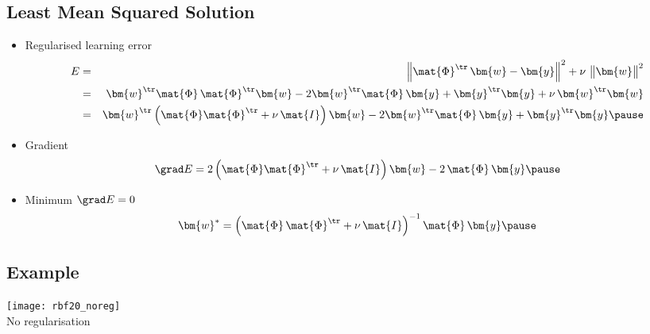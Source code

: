 \begin{slide}
\section{Least Mean Squared Solution}

\begin{PauseHighLight}

\begin{itemize}
\item Regularised learning error
  \begin{eqnarray*}
    E &=& \left\|\strut \mat{\Phi}^\tr \, \bm{w}-\bm{y} \right\|^2 + \nu\,
    \left\| \strut \bm{w} \right\|^2 \\ &=& \bm{w}^\tr \mat{\Phi}\,
    \mat{\Phi}^\tr \bm{w} - 2 \bm{w}^\tr \mat{\Phi}\, \bm{y} + \bm{y}^\tr
    \bm{y} + \nu\, \bm{w}^\tr \bm{w}\\ &=& \bm{w}^\tr \left(
    \strut \mat{\Phi} \mat{\Phi}^\tr + \nu\, \mat{I} \right) \bm{w}
    - 2 \bm{w}^\tr \mat{\Phi}\, \bm{y} + \bm{y}^\tr \bm{y}\pause
  \end{eqnarray*}
\item Gradient
  \begin{displaymath}
    \grad E = 2 \left( \strut \mat{\Phi} \mat{\Phi}^\tr + \nu\, \mat{I}
    \right) \bm{w} - 2\, \mat{\Phi}\, \bm{y}\pause
  \end{displaymath}
\item Minimum $\grad E = 0$
  \begin{displaymath}
    \bm{w}^{*} = \left( \strut \mat{\Phi}\, \mat{\Phi}^\tr + \nu\, \mat{I}
    \right)^{-1} \mat{\Phi}\, \bm{y}\pause
  \end{displaymath}
\end{itemize}


\end{PauseHighLight}
\end{slide}


\begin{slide}
\section[-1]{Example}

\begin{center}
  \texttt{[image: rbf20\_noreg]}\\
  No regularisation\pause
\end{center}

\end{slide}

